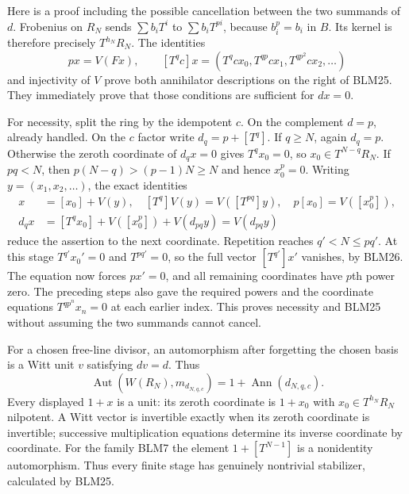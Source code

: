 Here is a proof including the possible cancellation between the two
summands of $d$. Frobenius on $R_N$ sends
$\sum b_iT^i$ to $\sum b_iT^{pi}$, because $b_i^p=b_i$ in $B$.
Its kernel is therefore precisely $T^{h_N}R_N$. The identities
\begin{equation}\tag{BLM26}
px=V(Fx),\qquad
[T^qc]x=(T^qcx_0,T^{qp}cx_1,T^{qp^2}cx_2,\ldots)
\end{equation}
and injectivity of $V$ prove both annihilator descriptions on
the right of BLM25. They immediately prove that those conditions
are sufficient for $dx=0$.

For necessity, split the ring by the idempotent $c$. On the
complement $d=p$, already handled. On the $c$ factor write
$d_q=p+[T^q]$. If $q\ge N$, again $d_q=p$. Otherwise the zeroth
coordinate of $d_qx=0$ gives $T^qx_0=0$, so
$x_0\in T^{N-q}R_N$. If $pq<N$, then
$p(N-q)>(p-1)N\ge N$ and hence $x_0^p=0$.
Writing $y=(x_1,x_2,\ldots)$, the exact identities
\begin{equation}\tag{BLM27}
\begin{split}
x&=[x_0]+V(y),\quad [T^q]V(y)=V([T^{pq}]y),\quad
p[x_0]=V([x_0^p]),\\
d_qx&=[T^qx_0]+V([x_0^p])+V(d_{pq}y)=V(d_{pq}y)
\end{split}
\end{equation}
reduce the assertion to the next coordinate. Repetition reaches
$q'<N\le pq'$. At this stage $T^{q'}x_0'=0$ and
$T^{pq'}=0$, so the full vector $[T^{q'}]x'$ vanishes, by
BLM26. The equation now forces $px'=0$, and all remaining
coordinates have $p$th power zero. The preceding steps also
gave the required powers and the coordinate equations
$T^{qp^n}x_n=0$ at each earlier index. This proves necessity
and BLM25 without assuming the two summands cannot cancel.

For a chosen free-line divisor, an automorphism after forgetting
the chosen basis is a Witt unit $v$ satisfying $dv=d$. Thus
\begin{equation}\tag{BLM28}
\operatorname{Aut}(W(R_N),m_{d_{N,q,c}})
=1+\operatorname{Ann}(d_{N,q,c}).
\end{equation}
Every displayed $1+x$ is a unit: its zeroth coordinate is
$1+x_0$ with $x_0\in T^{h_N}R_N$ nilpotent. A Witt vector is
invertible exactly when its zeroth coordinate is invertible;
successive multiplication equations determine its inverse
coordinate by coordinate. For the family BLM7 the element
$1+[T^{N-1}]$ is a nonidentity automorphism. Thus every finite
stage has genuinely nontrivial stabilizer, calculated by BLM25.

